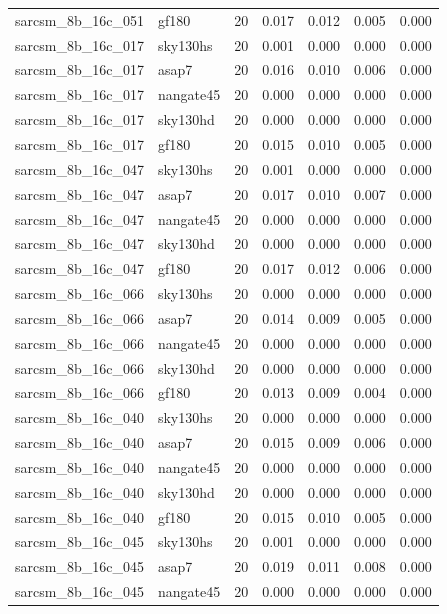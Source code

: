\begin{tabular}{llrrrrr}
sarcsm\_8b\_16c\_051 & gf180 & 20 & 0.017 & 0.012 & 0.005 & 0.000 \\
sarcsm\_8b\_16c\_017 & sky130hs & 20 & 0.001 & 0.000 & 0.000 & 0.000 \\
sarcsm\_8b\_16c\_017 & asap7 & 20 & 0.016 & 0.010 & 0.006 & 0.000 \\
sarcsm\_8b\_16c\_017 & nangate45 & 20 & 0.000 & 0.000 & 0.000 & 0.000 \\
sarcsm\_8b\_16c\_017 & sky130hd & 20 & 0.000 & 0.000 & 0.000 & 0.000 \\
sarcsm\_8b\_16c\_017 & gf180 & 20 & 0.015 & 0.010 & 0.005 & 0.000 \\
sarcsm\_8b\_16c\_047 & sky130hs & 20 & 0.001 & 0.000 & 0.000 & 0.000 \\
sarcsm\_8b\_16c\_047 & asap7 & 20 & 0.017 & 0.010 & 0.007 & 0.000 \\
sarcsm\_8b\_16c\_047 & nangate45 & 20 & 0.000 & 0.000 & 0.000 & 0.000 \\
sarcsm\_8b\_16c\_047 & sky130hd & 20 & 0.000 & 0.000 & 0.000 & 0.000 \\
sarcsm\_8b\_16c\_047 & gf180 & 20 & 0.017 & 0.012 & 0.006 & 0.000 \\
sarcsm\_8b\_16c\_066 & sky130hs & 20 & 0.000 & 0.000 & 0.000 & 0.000 \\
sarcsm\_8b\_16c\_066 & asap7 & 20 & 0.014 & 0.009 & 0.005 & 0.000 \\
sarcsm\_8b\_16c\_066 & nangate45 & 20 & 0.000 & 0.000 & 0.000 & 0.000 \\
sarcsm\_8b\_16c\_066 & sky130hd & 20 & 0.000 & 0.000 & 0.000 & 0.000 \\
sarcsm\_8b\_16c\_066 & gf180 & 20 & 0.013 & 0.009 & 0.004 & 0.000 \\
sarcsm\_8b\_16c\_040 & sky130hs & 20 & 0.000 & 0.000 & 0.000 & 0.000 \\
sarcsm\_8b\_16c\_040 & asap7 & 20 & 0.015 & 0.009 & 0.006 & 0.000 \\
sarcsm\_8b\_16c\_040 & nangate45 & 20 & 0.000 & 0.000 & 0.000 & 0.000 \\
sarcsm\_8b\_16c\_040 & sky130hd & 20 & 0.000 & 0.000 & 0.000 & 0.000 \\
sarcsm\_8b\_16c\_040 & gf180 & 20 & 0.015 & 0.010 & 0.005 & 0.000 \\
sarcsm\_8b\_16c\_045 & sky130hs & 20 & 0.001 & 0.000 & 0.000 & 0.000 \\
sarcsm\_8b\_16c\_045 & asap7 & 20 & 0.019 & 0.011 & 0.008 & 0.000 \\
sarcsm\_8b\_16c\_045 & nangate45 & 20 & 0.000 & 0.000 & 0.000 & 0.000 \\

\end{tabular}
